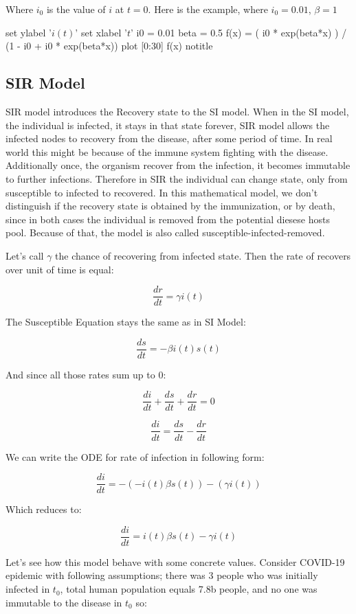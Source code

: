 \documentclass[nostrict]{szablonPG}
\begin{document}
Where $i_0$ is the value of $i$ at $t = 0$. Here is the example, where $i_0 = 0.01$, $\beta = 1$


\begin{gnuplot}[scale=0.8]
	set ylabel '$i(t)$'
	set xlabel '$t$'
	i0 = 0.01
	beta = 0.5
	f(x) = ( i0 * exp(beta*x) ) / (1 - i0 + i0 * exp(beta*x))
	plot [0:30] f(x) notitle
\end{gnuplot}

\subsection{SIR Model}

SIR model introduces the Recovery state to the SI model. When in the SI model, the individual is infected, it stays in that state forever, SIR model allows the infected nodes to recovery from the disease, after some period of time. In real world this might be because of the immune system fighting with the disease. Additionally once, the organism recover from the infection, it becomes immutable to further infections. Therefore in SIR the individual can change state, only from susceptible to infected to recovered. In this mathematical model, we don't distinguish if the recovery state is obtained by the immunization, or  by death, since in both cases the individual is removed from the potential diesese hosts pool. Because of that, the model is also called susceptible-infected-removed.

Let's call $\gamma$ the chance of recovering from infected state. Then the rate of recovers over unit of time is equal:

\[\frac{dr}{dt} = \gamma i(t)\]

The Susceptible Equation stays the same as in SI Model:

\[\frac{ds}{dt} = -\beta i(t) s(t)\]

And since all those rates sum up to 0:

\[\frac{di}{dt} + \frac{ds}{dt} + \frac{dr}{dt} = 0\]

\[\frac{di}{dt} = \frac{ds}{dt} - \frac{dr}{dt}\]

We can write the ODE for rate of infection in following form:

\[\frac{di}{dt} = -(- i(t) \beta s(t)) - (\gamma i(t))\]

Which reduces to:

\[\frac{di}{dt} = i(t) \beta s(t) - \gamma i(t)\]


Let's see how this model behave with some concrete values.  Consider COVID-19 epidemic with following assumptions; there was 3 people who was initially infected in $t_0$, total human population equals 7.8b people, and no one was immutable to the disease in $t_0$ so:
\end{document}
